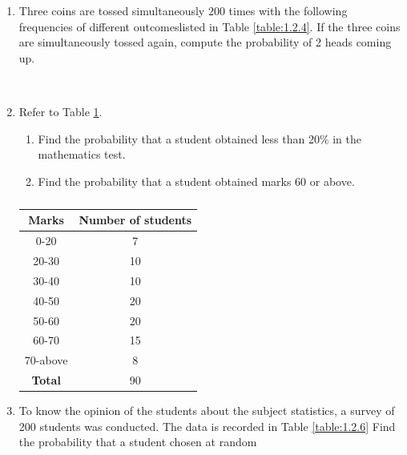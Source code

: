 \begin{enumerate}[label=\arabic*.,ref=\thesubsection.\theenumi]
\item Three coins are tossed simultaneously 200 times with the following frequencies of different outcomeslisted in Table \ref{table:1.2.4}.
If the three coins are simultaneously tossed again, compute the probability of 2 heads coming up.
%
\begin{table}[!ht]
\caption{}
\label{table:1.2.4}
\end{table}
\\
\solution

\item Refer to Table \ref{table:1.2.5}.
\begin{enumerate}
\item  Find the probability that a student obtained less than 20$\%$ in the mathematics test.
\item  Find the probability that a student obtained marks 60 or above.
\end{enumerate}
\begin{table}[!ht]
\centering
\begin{tabular}{ |c|c| } 
 \hline
 \textbf{Marks} &\textbf{Number of students}\\
 \hline
  0-20 &7\\ 
  20-30 &10\\ 
  30-40 &10\\ 
  40-50 &20\\ 
  50-60 &20\\ 
  60-70 &15\\ 
  70-above &8\\ 
  \hline
 \textbf{Total}  &90\\ 
 \hline
\end{tabular}
\caption{}
\label{table:1.2.5}
\end{table}
\solution

%
\item To know the opinion of the students about the subject statistics, a survey of 200 students was conducted. The data is recorded in Table \ref{table:1.2.6}
Find the probability that a student chosen at random
\begin{enumerate}

\end{enumerate}
\end{enumerate}
